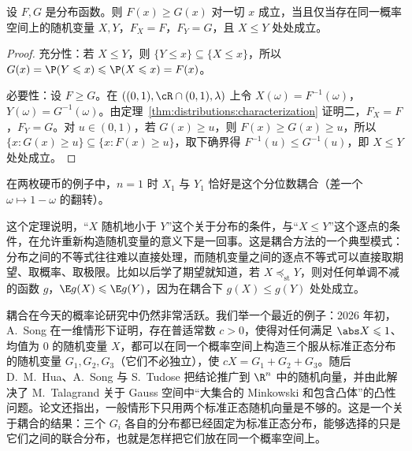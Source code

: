 \begin{theorem}[随机序的耦合刻画]\label{thm:distributions:stochastic-coupling}
设 $F,G$ 是分布函数。则 $F(x)\geqslant G(x)$ 对一切 $x$ 成立，当且仅当存在同一概率空间上的随机变量 $X,Y$，$F_X=F$，$F_Y=G$，且 $X\leqslant Y$ 处处成立。
\end{theorem}
\begin{proof}
充分性：若 $X\leqslant Y$，则 $\{Y\leqslant x\}\subseteq\{X\leqslant x\}$，所以 $G(x)=\P(Y\leqslant x)\leqslant \P(X\leqslant x)=F(x)$。

必要性：设 $F\geqslant G$。在 $((0,1),\cR\cap(0,1),\lambda)$ 上令 $X(\omega)=F^{-1}(\omega)$，$Y(\omega)=G^{-1}(\omega)$。由定理~\ref{thm:distributions:characterization} 证明二，$F_X=F$，$F_Y=G$。对 $u\in(0,1)$，若 $G(x)\geqslant u$，则 $F(x)\geqslant G(x)\geqslant u$，所以 $\{x:G(x)\geqslant u\}\subseteq\{x:F(x)\geqslant u\}$，取下确界得 $F^{-1}(u)\leqslant G^{-1}(u)$，即 $X\leqslant Y$ 处处成立。
\end{proof}

在两枚硬币的例子中，$n=1$ 时 $X_1$ 与 $Y_1$ 恰好是这个分位数耦合（差一个 $\omega\mapsto1-\omega$ 的翻转）。

\begin{remark}
这个定理说明，“$X$ 随机地小于 $Y$”这个关于分布的条件，与“$X\leqslant Y$”这个逐点的条件，在允许重新构造随机变量的意义下是一回事。这是耦合方法的一个典型模式：分布之间的不等式往往难以直接处理，而随机变量之间的逐点不等式可以直接取期望、取概率、取极限。比如以后学了期望就知道，若 $X\preceq_{\mathrm{st}}Y$，则对任何单调不减的函数 $g$，$\E g(X)\leqslant \E g(Y)$，因为在耦合下 $g(X)\leqslant g(Y)$ 处处成立。
\end{remark}

\begin{historynote}
耦合在今天的概率论研究中仍然非常活跃。我们举一个最近的例子：2026 年初，A.\ Song 在一维情形下证明，存在普适常数 $c>0$，使得对任何满足 $\abs X\leqslant1$、均值为 $0$ 的随机变量 $X$，都可以在同一个概率空间上构造三个服从标准正态分布的随机变量 $G_1,G_2,G_3$（它们不必独立），使 $cX=G_1+G_2+G_3$。随后 D.\ M.\ Hua、A.\ Song 与 S.\ Tudose 把结论推广到 $\R^n$ 中的随机向量，并由此解决了 M.\ Talagrand 关于 Gauss 空间中“大集合的 Minkowski 和包含凸体”的凸性问题。论文还指出，一般情形下只用两个标准正态随机向量是不够的。这是一个关于耦合的结果：三个 $G_i$ 各自的分布都已经固定为标准正态分布，能够选择的只是它们之间的联合分布，也就是怎样把它们放在同一个概率空间上。
\end{historynote}


